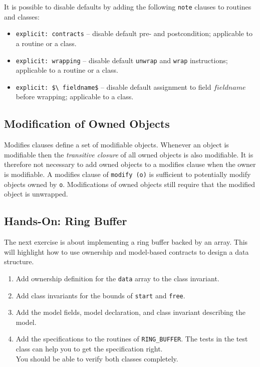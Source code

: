 \documentclass[a4paper,12pt]{article}
\newcommand{\e}[1]{\mbox{\lstinline[language=Eiffel]|#1|}}
\begin{document}
It is possible to disable defaults by adding the following \e{note} clauses to routines and classes:
\begin{itemize}
\item \e{explicit: contracts} -- disable default pre- and postcondition; applicable to a routine or a class.
\item \e{explicit: wrapping} -- disable default \e{unwrap} and \e{wrap} instructions; applicable to a routine or a class.
\item \e{explicit: $\ fieldname$} -- disable default assignment to field $fieldname$ before wrapping; applicable to a class.
\end{itemize}

\subsection{Modification of Owned Objects}

Modifies clauses define a set of modifiable objects. Whenever an object is modifiable then the \emph{transitive closure} of all owned objects is also modifiable. It is therefore not necessary to add owned objects to a modifies clause when the owner is modifiable. A modifies clause of \e{modify (o)} is sufficient to potentially modify objects owned by \e{o}. Modifications of owned objects still require that the modified object is unwrapped.

\subsection{Hands-On: Ring Buffer}

The next exercise is about implementing a ring buffer backed by an array. This will highlight how to use ownership and model-based contracts to design a data structure.

\begin{enumerate}[label=\bfseries Task \arabic*:, leftmargin=1.8cm]
\item Add ownership definition for the \e{data} array to the class invariant.
\item Add class invariants for the bounds of \e{start} and \e{free}.
\item Add the model fields, model declaration, and class invariant describing the model.
\item Add the specifications to the routines of \e{RING_BUFFER}. The tests in the test class can help you to get the specification right. \\
      You should be able to verify both classes completely.
\end{enumerate}
\end{document}
